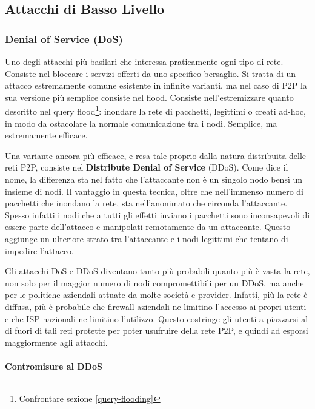 \subsection{Attacchi di Basso Livello}\label{attacchi-di-basso-livello}

\subsubsection{Denial of Service (DoS)}\label{denial-of-service-dos}

Uno degli attacchi più basilari che interessa praticamente ogni tipo di rete. Consiste nel bloccare i servizi offerti da uno specifico bersaglio. Si tratta di un attacco estremamente comune esistente in infinite varianti, ma nel caso di P2P la sua versione più semplice consiste nel flood. Consiste nell'estremizzare quanto descritto nel query flood\footnote{Confrontare sezione \ref{query-flooding}}: inondare la rete di pacchetti, legittimi o creati ad-hoc, in modo da ostacolare la normale comunicazione tra i nodi. Semplice, ma estremamente efficace.

Una variante ancora più efficace, e resa tale proprio dalla natura distribuita delle reti P2P, consiste nel \textbf{Distribute Denial of Service} (DDoS). Come dice il nome, la differenza sta nel fatto che l'attaccante non è un singolo nodo bensì un insieme di nodi. Il vantaggio in questa tecnica, oltre che nell'immenso numero di pacchetti che inondano la rete, sta nell'anonimato che circonda l'attaccante. Spesso infatti i nodi che a tutti gli effetti inviano i pacchetti sono inconsapevoli di essere parte dell'attacco e manipolati remotamente da un attaccante. Questo aggiunge un ulteriore strato tra l'attaccante e i nodi legittimi che tentano di impedire l'attacco.

Gli attacchi DoS e DDoS diventano tanto più probabili quanto più è vasta la rete, non solo per il maggior numero di nodi compromettibili per un DDoS, ma anche per le politiche aziendali attuate da molte società e provider. Infatti, più la rete è diffusa, più è probabile che firewall aziendali ne limitino l'accesso ai propri utenti e che ISP nazionali ne limitino l'utilizzo. Questo costringe gli utenti a piazzarsi al di fuori di tali reti protette per poter usufruire della rete P2P, e quindi ad esporsi maggiormente agli attacchi.

\paragraph{Contromisure al DDoS}\label{contromisure-al-ddos}

